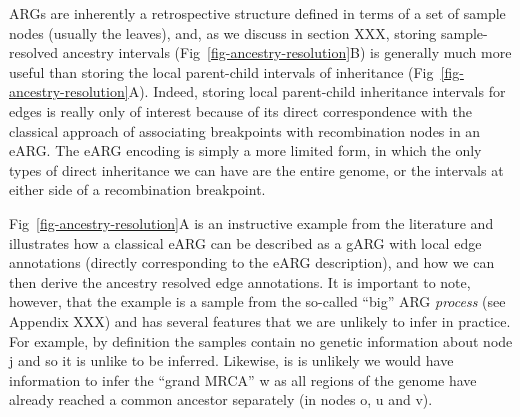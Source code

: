 \documentclass{article}
\begin{document}
ARGs are inherently a retrospective structure defined in terms
of a set of sample nodes (usually the leaves), and,
as we discuss in section XXX, storing sample-resolved ancestry
intervals (Fig~\ref{fig-ancestry-resolution}B) is generally much more
useful than storing the local parent-child intervals of inheritance
(Fig~\ref{fig-ancestry-resolution}A).
Indeed, storing local parent-child
inheritance intervals for edges is really only of interest because of
its direct correspondence with the classical approach of associating
breakpoints with recombination nodes in an eARG. The eARG encoding
is simply a more limited form, in which the only types of direct
inheritance we can have are the entire genome, or the intervals
at either side of a recombination breakpoint.

Fig~\ref{fig-ancestry-resolution}A is an instructive example
from the literature \citep{wiuf1999recombination} and illustrates
how a classical eARG can be described as a gARG with local edge annotations
(directly corresponding to the eARG description), and how we can
then derive the ancestry resolved edge annotations.
It is important to note, however, that the example is a sample from
the so-called ``big'' ARG \emph{process} (see Appendix XXX)
and has several features that we are unlikely to infer in practice.
For example, by definition the samples contain no genetic information about
node \textsf{j} and so it is unlike to be inferred.
Likewise, is is unlikely we would have information to infer the ``grand MRCA''
\textsf{w} as all regions of the genome have already reached a
common ancestor separately
(in nodes \textsf{o}, \textsf{u}  and \textsf{v}).

\end{document}
